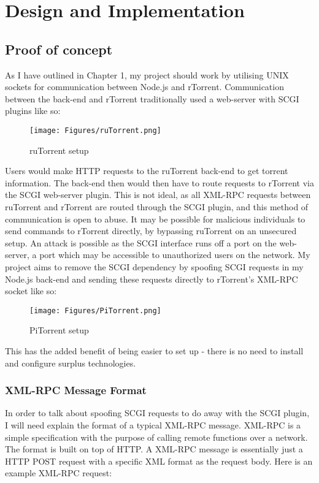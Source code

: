 \chapter{Design and Implementation} 

\label{Chapter3} 



\section{Proof of concept}
As I have outlined in Chapter 1, my project should work by utilising UNIX sockets for communication between Node.js and rTorrent. Communication between the back-end and rTorrent traditionally used a web-server with SCGI plugins like so: 

\begin{figure}[h!]
  \centering
    \texttt{[image: Figures/ruTorrent.png]}
  \caption{ruTorrent setup}
\end{figure}

Users would make HTTP requests to the ruTorrent back-end to get torrent information. The back-end then would then have to route requests to rTorrent via the SCGI web-server plugin. This is not ideal, as all XML-RPC requests between ruTorrent and rTorrent are routed through the SCGI plugin, and this method of communication is open to abuse. It may be possible for malicious individuals to send commands to rTorrent directly, by bypassing ruTorrent on an unsecured setup. An attack is possible as the SCGI interface runs off a port on the web-server, a port which may be accessible to unauthorized users on the network. My project aims to remove the SCGI dependency by spoofing SCGI requests in my Node.js back-end and sending these requests directly to rTorrent's XML-RPC socket like so:

\begin{figure}[h!]
  \centering
    \texttt{[image: Figures/PiTorrent.png]}
  \caption{PiTorrent setup}
\end{figure}

This has the added benefit of being easier to set up - there is no need to install and configure surplus technologies.


\subsection{XML-RPC Message Format}
In order to talk about spoofing SCGI requests to do away with the SCGI plugin, I will need explain the format of a typical XML-RPC message\cite{XML-RPC}. XML-RPC is a simple specification with the purpose of calling remote functions over a network. The format is built on top of HTTP. A XML-RPC message is essentially just a HTTP POST request with a specific XML format as the request body. Here is an example XML-RPC request:

